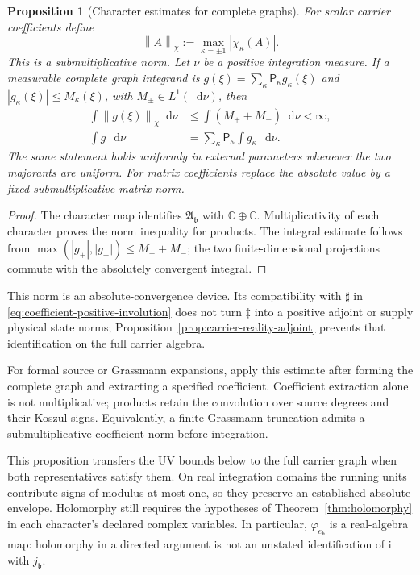 \documentclass[final,5p,times,twocolumn,numbers,nopreprintline]{elsarticle}
\numberwithin{equation}{section}
\newtheorem{proposition}[theorem]{Proposition}
\theoremstyle{definition}
\theoremstyle{remark}
\newcommand{\dd}{\mathop{}\!\mathrm d}
\newcommand{\ii}{\mathrm i}
\newcommand{\bb}{\mathfrak b}
\newcommand{\CC}{\mathbb C}
\newcommand{\norm}[1]{\left\lVert #1\right\rVert}
\newcommand{\ee}{e_{\bb}}
\newcommand{\je}{j_{\bb}}
\newcommand{\embed}{\varphi_{\ee}}
\begin{document}
\begin{proposition}[Character estimates for complete graphs]
\label{prop:character-majorants}
For scalar carrier coefficients define
\begin{equation}
 \norm{A}_{\chi}:=\max_{\kappa=\pm1}|\chi_\kappa(A)|.
 \label{eq:character-norm}
\end{equation}
This is a submultiplicative norm. Let \(\nu\) be a positive
integration measure. If a measurable complete graph integrand is
\(g(\xi)=\sum_\kappa\mathsf P_\kappa g_\kappa(\xi)\)
and \(|g_\kappa(\xi)|\leq M_\kappa(\xi)\), with
\(M_\pm\in L^1(\dd\nu)\), then
\begin{equation}
\begin{aligned}
 \int\norm{g(\xi)}_\chi\dd\nu
 &\leq\int(M_++M_-)\dd\nu<\infty,\\
 \int g\,\dd\nu
 &=\sum_\kappa\mathsf P_\kappa\int g_\kappa\,\dd\nu.
\end{aligned}
 \label{eq:character-integral-majorant}
\end{equation}
The same statement holds uniformly in external parameters whenever
the two majorants are uniform. For matrix coefficients replace the
absolute value by a fixed submultiplicative matrix norm.
\end{proposition}

\begin{proof}
The character map identifies \(\mathfrak A_{\bb}\) with
\(\CC\oplus\CC\). Multiplicativity of each character proves
the norm inequality for products. The integral estimate follows from
\(\max(|g_+|,|g_-|)\leq M_++M_-\); the two finite-dimensional
projections commute with the absolutely convergent integral.
\end{proof}

This norm is an absolute-convergence device. Its compatibility with
\(\sharp\) in \eqref{eq:coefficient-positive-involution} does not
turn \(\ddagger\) into a positive adjoint or supply physical
state norms; Proposition~\ref{prop:carrier-reality-adjoint} prevents
that identification on the full carrier algebra.

For formal source or Grassmann expansions, apply this estimate after
forming the complete graph and extracting a specified coefficient.
Coefficient extraction alone is not multiplicative; products retain
the convolution over source degrees and their Koszul signs. Equivalently,
a finite Grassmann truncation admits a submultiplicative coefficient
norm before integration.

This proposition transfers the UV bounds below to the full carrier
graph when both representatives satisfy them. On real integration
domains the running units contribute signs of modulus at most one,
so they preserve an established absolute envelope. Holomorphy still
requires the hypotheses of Theorem~\ref{thm:holomorphy} in each
character's declared complex variables. In particular, \(\embed\)
is a real-algebra map: holomorphy in a directed argument is not an
unstated identification of \(\ii\) with \(\je\).
\end{document}
